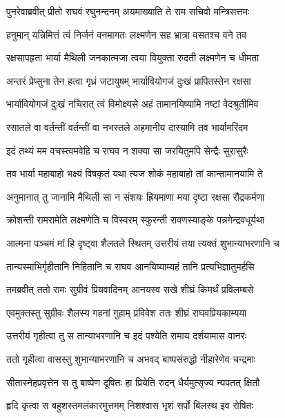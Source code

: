 
\twolineshloka
{पुनरेवाब्रवीत् प्रीतो राघवं रघुनन्दनम्}
{अयमाख्याति ते राम सचिवो मन्त्रिसत्तमः} %

\twolineshloka
{हनुमान् यन्निमित्तं त्वं निर्जनं वनमागतः}
{लक्ष्मणेन सह भ्रात्रा वसतश्च वने तव} %

\twolineshloka
{रक्षसापहृता भार्या मैथिली जनकात्मजा}
{त्वया वियुक्ता रुदती लक्ष्मणेन च धीमता} %

\twolineshloka
{अन्तरं प्रेप्सुना तेन हत्वा गृध्रं जटायुषम्}
{भार्यावियोगजं दुःखं प्रापितस्तेन रक्षसा} %

\twolineshloka
{भार्यावियोगजं दुःखं नचिरात् त्वं विमोक्ष्यसे}
{अहं तामानयिष्यामि नष्टां वेदश्रुतीमिव} %

\twolineshloka
{रसातले वा वर्तन्तीं वर्तन्तीं वा नभस्तले}
{अहमानीय दास्यामि तव भार्यामरिंदम} %

\twolineshloka
{इदं तथ्यं मम वचस्त्वमवेहि च राघव}
{न शक्या सा जरयितुमपि सेन्द्रैः सुरासुरैः} %

\twolineshloka
{तव भार्या महाबाहो भक्ष्यं विषकृतं यथा}
{त्यज शोकं महाबाहो तां कान्तामानयामि ते} %

\twolineshloka
{अनुमानात् तु जानामि मैथिली सा न संशयः}
{ह्रियमाणा मया दृष्टा रक्षसा रौद्रकर्मणा} %

\twolineshloka
{क्रोशन्ती रामरामेति लक्ष्मणेति च विस्वरम्}
{स्फुरन्ती रावणस्याङ्के पन्नगेन्द्रवधूर्यथा} %

\twolineshloka
{आत्मना पञ्चमं मां हि दृष्ट्वा शैलतले स्थितम्}
{उत्तरीयं तया त्यक्तं शुभान्याभरणानि च} %

\twolineshloka
{तान्यस्माभिर्गृहीतानि निहितानि च राघव}
{आनयिष्याम्यहं तानि प्रत्यभिज्ञातुमर्हसि} %

\twolineshloka
{तमब्रवीत् ततो रामः सुग्रीवं प्रियवादिनम्}
{आनयस्व सखे शीघ्रं किमर्थं प्रविलम्बसे} %

\twolineshloka
{एवमुक्तस्तु सुग्रीवः शैलस्य गहनां गुहाम्}
{प्रविवेश ततः शीघ्रं राघवप्रियकाम्यया} %

\twolineshloka
{उत्तरीयं गृहीत्वा तु स तान्याभरणानि च}
{इदं पश्येति रामाय दर्शयामास वानरः} %

\twolineshloka
{ततो गृहीत्वा वासस्तु शुभान्याभरणानि च}
{अभवद् बाष्पसंरुद्धो नीहारेणेव चन्द्रमाः} %

\twolineshloka
{सीतास्नेहप्रवृत्तेन स तु बाष्पेण दूषितः}
{हा प्रियेति रुदन् धैर्यमुत्सृज्य न्यपतत् क्षितौ} %

\twolineshloka
{हृदि कृत्वा स बहुशस्तमलंकारमुत्तमम्}
{निशश्वास भृशं सर्पो बिलस्थ इव रोषितः} %

